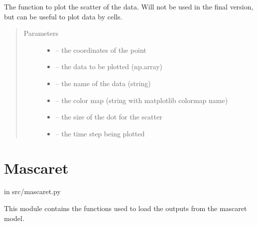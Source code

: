 \documentclass[letterpaper,10pt,english]{sphinxmanual}
\begin{document}

\begin{fulllineitems}
\label{\detokenize{index:src.hec_ras2D.scatter_plot}}
The function to plot the scatter of the data. Will not be used in the final version, but can be useful to
plot data by cells.
\begin{quote}\begin{description}
\item[{Parameters}] \leavevmode\begin{itemize}
\item {} 
 -- the coordinates of the point

\item {} 
 -- the data to be plotted (np.array)

\item {} 
 -- the name of the data (string)

\item {} 
 -- the color map (string with matplotlib colormap name)

\item {} 
 -- the size of the dot for the scatter

\item {} 
 -- the time step being plotted

\end{itemize}

\end{description}\end{quote}

\end{fulllineitems}



\section{Mascaret}
\label{\detokenize{index:mascaret}}
in src/mascaret.py

This module contains the functions used to load the outputs from the mascaret model.
\label{\detokenize{index:module-src.mascaret}}
\end{document}
